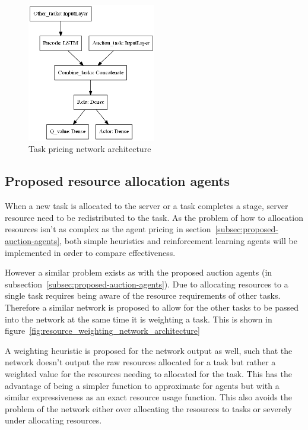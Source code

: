 \begin{figure}[h]
    \centering
    \includegraphics[width=0.5\textwidth]{figures/2_solution_figs/task_pricing_network_architecture.png}
    \caption{Task pricing network architecture}
    \label{fig:task_pricing_network_architecture}
\end{figure}

\subsection{Proposed resource allocation agents}\label{subsec:proposed-resource-allocation-agents}
When a new task is allocated to the server or a task completes a stage, server resource need to be redistributed
to the task. As the problem of how to allocation resources isn't as complex as the agent pricing in
section~\ref{subsec:proposed-auction-agents}, both simple heuristics and reinforcement learning agents will be
implemented in order to compare effectiveness.

However a similar problem exists as with the proposed auction agents (in subsection~\ref{subsec:proposed-auction-agents}).
Due to allocating resources to a single task requires being aware of the resource requirements of other
tasks. Therefore a similar network is proposed to allow for the other tasks
to be passed into the network at the same time it is weighting a task. This is shown in
figure~\ref{fig:resource_weighting_network_architecture}

A weighting heuristic is proposed for the network output as well, such that the network doesn't output the raw
resources allocated for a task but rather a weighted value for the resources needing to allocated for the task.
This has the advantage of being a simpler function to approximate for agents but with a similar expressiveness as an
exact resource usage function. This also avoids the problem of the network either over allocating the resources to tasks
or severely under allocating resources.


